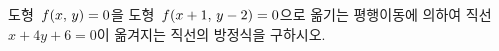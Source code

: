 도형~$f(x,\mkern3mu y)=0$을 도형~$f(x+1,\mkern3mu y-2)=0$으로 옮기는 평행이동에 의하여 직선~$x+4y+6=0$이 옮겨지는 직선의 방정식을 구하시오.
